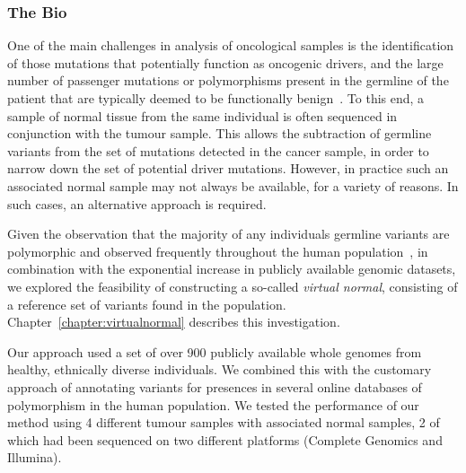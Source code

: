 \subsubsection{The Bio}
One of the main challenges in analysis of oncological samples is the identification of those mutations that potentially function as oncogenic drivers, and the large number of passenger mutations or polymorphisms present in the germline of the patient that are typically deemed to be functionally benign~\cite{lawrence2013mutational}. To this end, a sample of normal tissue from the same individual is often sequenced in conjunction with the tumour sample. This allows the subtraction of germline variants from the set of mutations detected in the cancer sample, in order to narrow down the set of potential driver mutations. However, in practice such an associated normal sample may not always be available, for a variety of reasons. In such cases, an alternative approach is required.

Given the observation that the majority of any individuals germline variants are polymorphic and observed frequently throughout the human population~\cite{10002010map,10002012integrated}, in combination with the exponential increase in publicly available genomic datasets, we explored the feasibility of constructing a so-called \emph{virtual normal}, consisting of a reference set of variants found in the population. Chapter~\ref{chapter:virtualnormal} describes this investigation.

Our approach used a set of over 900 publicly available whole genomes from healthy, ethnically diverse individuals. We combined this with the customary approach of annotating variants for presences in several online databases of polymorphism in the human population. We tested the performance of our method using 4 different tumour samples with associated normal samples, 2 of which had been sequenced on two different platforms (Complete Genomics and Illumina).


